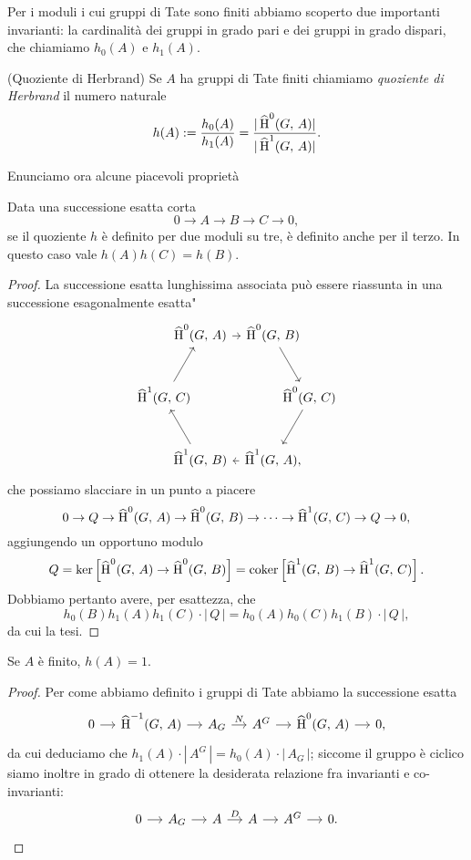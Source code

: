 Per i moduli i cui gruppi di Tate sono finiti abbiamo scoperto due importanti invarianti: la cardinalità dei gruppi in grado pari e dei gruppi in grado dispari, che chiamiamo $ h_0(A) $ e $ h_1(A) $.

\begin{definition}(Quoziente di Herbrand)
	Se $ A $ ha gruppi di Tate finiti chiamiamo \emph{quoziente di Herbrand} il numero naturale
	\[ {h}(A) := \frac{h_0(A)}{h_1(A)} = \frac{|\operatorname{\widehat{H}}^0(G, \, A)|}{|\operatorname{\widehat{H}}^1(G, \, A)|}. \]
\end{definition}

Enunciamo ora alcune piacevoli proprietà

\begin{lemma}\label{Herb1}
	Data una successione esatta corta
	\[ 0 \to A \to B \to C \to 0, \]
	se il quoziente $ h $ è definito per due moduli su tre, è definito anche per il terzo. In questo caso vale $ h(A)h(C) = h(B) $.
\end{lemma}
\begin{proof}
	La successione esatta lunghissima associata può essere riassunta in una successione \leftquote esagonalmente esatta"
	\[\begin{tikzcd}[column sep={1cm,between origins}, row sep={1.732050808cm,between origins}]
	& \Hh^0(G, \, A) \arrow[rr] && \Hh^0(G, \, B) \arrow[rd] &  \\
	\Hh^1(G, \, C) \arrow[ru]&  &&  & \Hh^0(G, \, C) \arrow[ld] \\				& \Hh^1(G, \, B) \arrow[lu] && \Hh^1(G, \, A) \arrow[ll], & 
	\end{tikzcd}\]
	che possiamo slacciare in un punto a piacere
	\[ 0 \to Q \to \operatorname{\widehat{H}}^0(G, \, A) \to \operatorname{\widehat{H}}^0(G, \, B) \to \dots \to \operatorname{\widehat{H}}^1(G, \, C) \to Q \to 0, \]
	aggiungendo un opportuno modulo $$  Q = \ker \left[\operatorname{\widehat{H}}^0(G, \, A) \to \operatorname{\widehat{H}}^0(G, \, B)\right] = \operatorname{coker}\left[ \operatorname{\widehat{H}}^1(G, \, B) \to \operatorname{\widehat{H}}^1(G, \, C) \right].  $$
	Dobbiamo pertanto avere, per esattezza, che
	\[  h_0(B) h_1(A) h_1(C) \cdot |\,Q\,| = h_0(A) h_0(C) h_1(B) \cdot |\,Q\,|, \]			da cui la tesi.
\end{proof}

\begin{lemma}\label{Herb2}
	Se $ A $ è finito, $ h(A) = 1 $.
\end{lemma}
\begin{proof}
	Per come abbiamo definito i gruppi di Tate abbiamo la successione esatta
	\begin{equation*}			\begin{tikzcd}[column sep = small]
	0 \rar& \Hh^{-1}(G, \, A) \rar& A_G \rar["N"]& A^G \rar&\Hh^0(G, \, A) \rar& 0,
	\end{tikzcd}
	\end{equation*}
	da cui deduciamo che $ h_1(A) \cdot |\, A^G\, | =  h_0(A) \cdot |\, A_G\, | $; siccome il gruppo è ciclico siamo inoltre in grado di ottenere la desiderata relazione fra invarianti e co-invarianti:
	\begin{equation*}
	\begin{tikzcd}[column sep = small]
	0 \rar& A_G \rar& A \rar["D"]& A \rar& A^G \rar& 0.
	\end{tikzcd}
	\end{equation*}
\end{proof}

